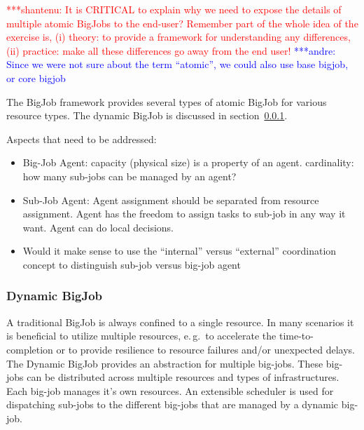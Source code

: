 \documentclass[conference,final]{IEEEtran}
\newcommand{\jhanote}[1]{ {\textcolor{red} { ***shantenu: #1 }}}
\newcommand{\alnote}[1]{ {\textcolor{blue} { ***andre: #1 }}}
\newcommand{\alnote}[1]{}
\newcommand{\jhanote}[1]{}
\begin{document}
\jhanote{It is CRITICAL to explain why we need to expose the details
  of multiple atomic BigJobs to the end-user? Remember part of the
  whole idea of the exercise is, (i) theory: to provide a framework
  for understanding any differences, (ii) practice: make all these
  differences go away from the end user!}
\alnote{Since we were not sure about the term ``atomic'', we could also use base 
bigjob, or core bigjob}

The BigJob framework provides several types of atomic BigJob for
various resource types. The dynamic BigJob is discussed in
section~\ref{sec:dynamic_bigjob}.


Aspects that need to be addressed:
\begin{itemize}
    \item Big-Job Agent: capacity (physical size) is a property of an agent. 
	cardinality: how many sub-jobs can be managed by an agent?
	\item Sub-Job Agent: Agent assignment should be separated from resource 
	assignment. Agent has the freedom to assign tasks to sub-job in any way 
	it want. Agent can do local decisions.    
  \item Would it make sense to use the ``internal'' versus
    ``external'' coordination concept to distinguish sub-job
    versus big-job agent
\end{itemize}

\subsubsection{Dynamic BigJob}

\label{sec:dynamic_bigjob}
A traditional BigJob is always confined to a single resource. In many scenarios 
it is beneficial to utilize multiple resources, e.\,g.\ to accelerate the
time-to-completion or to provide resilience to resource failures and/or
unexpected delays. The Dynamic BigJob provides an abstraction for multiple
big-jobs. These big-jobs can be distributed across multiple resources and types
of infrastructures. Each big-job manages it's own resources. An extensible
scheduler is used for dispatching sub-jobs to the different big-jobs that are
managed by a dynamic big-job.
\end{document}
